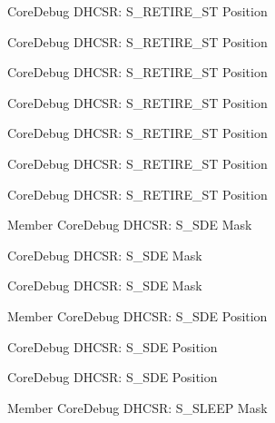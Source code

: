 \begin{DoxyRefList}
\label{deprecated__deprecated000307}%
%
Core\+Debug DHCSR\+: S\+\_\+\+RETIRE\+\_\+\+ST Position 

\label{deprecated__deprecated000564}%
%
Core\+Debug DHCSR\+: S\+\_\+\+RETIRE\+\_\+\+ST Position 

\label{deprecated__deprecated000383}%
%
Core\+Debug DHCSR\+: S\+\_\+\+RETIRE\+\_\+\+ST Position 

\label{deprecated__deprecated000111}%
%
Core\+Debug DHCSR\+: S\+\_\+\+RETIRE\+\_\+\+ST Position 

\label{deprecated__deprecated000011}%
%
Core\+Debug DHCSR\+: S\+\_\+\+RETIRE\+\_\+\+ST Position 

\label{deprecated__deprecated000165}%
%
Core\+Debug DHCSR\+: S\+\_\+\+RETIRE\+\_\+\+ST Position 

\label{deprecated__deprecated000462}%
%
Core\+Debug DHCSR\+: S\+\_\+\+RETIRE\+\_\+\+ST Position  
\item[Member \doxylink{group__CMSIS__SCB_ga67f2b2b6729ab2db89f97bbe75224e9d}{Core\+Debug\+\_\+\+DHCSR\+\_\+\+S\+\_\+\+SDE\+\_\+\+Msk} ]\label{deprecated__deprecated000020}%
%
Core\+Debug DHCSR\+: S\+\_\+\+SDE Mask 

\label{deprecated__deprecated000471}%
%
Core\+Debug DHCSR\+: S\+\_\+\+SDE Mask 

\label{deprecated__deprecated000573}%
%
Core\+Debug DHCSR\+: S\+\_\+\+SDE Mask  
\item[Member \doxylink{group__CMSIS__SCB_ga34b00f5a0109d236647be6609d6f04b3}{Core\+Debug\+\_\+\+DHCSR\+\_\+\+S\+\_\+\+SDE\+\_\+\+Pos} ]\label{deprecated__deprecated000470}%
%
Core\+Debug DHCSR\+: S\+\_\+\+SDE Position 

\label{deprecated__deprecated000572}%
%
Core\+Debug DHCSR\+: S\+\_\+\+SDE Position 

\label{deprecated__deprecated000019}%
%
Core\+Debug DHCSR\+: S\+\_\+\+SDE Position  
\item[Member \doxylink{group__CMSIS__CoreDebug_ga98d51538e645c2c1a422279cd85a0a25}{Core\+Debug\+\_\+\+DHCSR\+\_\+\+S\+\_\+\+SLEEP\+\_\+\+Msk} ]\label{deprecated__deprecated000388}%
%
Core\+Debug DHCSR\+: S\+\_\+\+SLEEP Mask 


\end{DoxyRefList}

